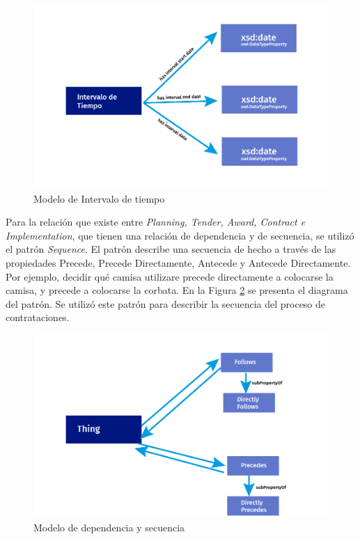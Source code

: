 \begin{figure}[ht!]
    \centering
    \includegraphics[width=150mm]{figuras/Diagramas_Tiempo.png}
    \caption{Modelo de Intervalo de tiempo}
    \label{img:Modelo de Intervalo de precio}
    
\end{figure}

Para la relación que existe entre \textit{Planning, Tender, Award, Contract e Implementation}, que tienen una relación de dependencia y de secuencia, se utilizó el patrón \textit{Sequence}. El patrón describe una secuencia de hecho a través de las propiedades Precede, Precede Directamente, Antecede y Antecede Directamente. Por ejemplo, decidir qué camisa utilizare precede directamente a colocarse la camisa, y precede a colocarse la corbata. En la Figura \ref{img:Modelo de dependencia y secuencia} se presenta el diagrama del patrón. Se utilizó este patrón para describir la secuencia del proceso de contrataciones.

\begin{figure}[ht!]
    \centering
    \includegraphics[width=150mm]{figuras/Diagramas_Follows.png}
    \caption{Modelo de dependencia y secuencia}
    \label{img:Modelo de dependencia y secuencia}
    
\end{figure}

